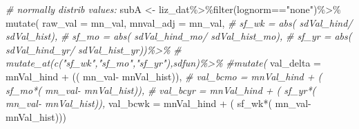 \documentclass[
]{article}
\newenvironment{Shaded}{\begin{snugshade}}{\end{snugshade}}
\newcommand{\AttributeTok}[1]{\textcolor[rgb]{0.77,0.63,0.00}{#1}}
\newcommand{\CommentTok}[1]{\textcolor[rgb]{0.56,0.35,0.01}{\textit{#1}}}
\newcommand{\FunctionTok}[1]{\textcolor[rgb]{0.00,0.00,0.00}{#1}}
\newcommand{\NormalTok}[1]{#1}
\newcommand{\OtherTok}[1]{\textcolor[rgb]{0.56,0.35,0.01}{#1}}
\newcommand{\SpecialCharTok}[1]{\textcolor[rgb]{0.00,0.00,0.00}{#1}}
\newcommand{\StringTok}[1]{\textcolor[rgb]{0.31,0.60,0.02}{#1}}
\begin{document}
\begin{Shaded}
\begin{Highlighting}[]
        \CommentTok{\# normally distrib values:}
\NormalTok{        subA }\OtherTok{\textless{}{-}}\NormalTok{ liz\_dat}\SpecialCharTok{\%\textgreater{}\%}\FunctionTok{filter}\NormalTok{(lognorm}\SpecialCharTok{==}\StringTok{"none"}\NormalTok{)}\SpecialCharTok{\%\textgreater{}\%}
          \FunctionTok{mutate}\NormalTok{(}
          \AttributeTok{raw\_val   =}\NormalTok{ mn\_val,}
          \AttributeTok{mnval\_adj =}\NormalTok{ mn\_val,}
          \CommentTok{\#  sf\_wk  = abs(  sdVal\_hind/  sdVal\_hist),}
          \CommentTok{\#  sf\_mo  = abs(  sdVal\_hind\_mo/  sdVal\_hist\_mo),}
          \CommentTok{\#  sf\_yr  = abs(  sdVal\_hind\_yr/  sdVal\_hist\_yr))\%\textgreater{}\%}
          \CommentTok{\# mutate\_at(c("sf\_wk","sf\_mo","sf\_yr"),sdfun)\%\textgreater{}\%}
          \CommentTok{\#mutate(}
           \AttributeTok{val\_delta =}\NormalTok{   mnVal\_hind }\SpecialCharTok{+}\NormalTok{ (( mn\_val}\SpecialCharTok{{-}}\NormalTok{  mnVal\_hist)),}
           \CommentTok{\# val\_bcmo  =   mnVal\_hind + ( sf\_mo*( mn\_val{-} mnVal\_hist)),}
           \CommentTok{\# val\_bcyr  =   mnVal\_hind + ( sf\_yr*( mn\_val{-} mnVal\_hist)),}
           \AttributeTok{val\_bcwk  =}\NormalTok{   mnVal\_hind }\SpecialCharTok{+}\NormalTok{ ( sf\_wk}\SpecialCharTok{*}\NormalTok{( mn\_val}\SpecialCharTok{{-}}\NormalTok{ mnVal\_hist)))}
        

\end{Highlighting}
\end{Shaded}
\end{document}
